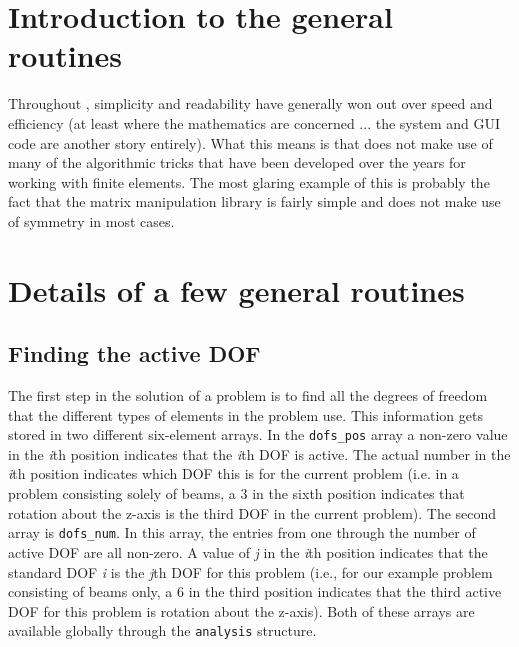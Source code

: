 \section{Introduction to the general \felt{} routines}

Throughout \felt{}, simplicity and readability have generally won out over 
speed and efficiency (at least where the mathematics are concerned ... the 
system and GUI code are another story entirely).
What this means is that \felt{} does not make use of many of the algorithmic 
tricks that have been developed over the years for working with finite 
elements.  The most glaring example of this is probably the fact that the 
\felt{} matrix manipulation library is fairly simple and does not make use of 
symmetry in most cases.  

\section{Details of a few general \felt{} routines}

\subsection{Finding the active DOF}
The first step in the solution of a \felt{} problem is to 
find all the degrees of freedom that the different types of elements in 
the problem use.  This information gets stored in two different six-element 
arrays.  In the {\tt dofs\_pos} array a non-zero value 
in the {\em i}th position indicates that the {\em i}th DOF is 
active.  The actual number in the {\em i}th position indicates which DOF this 
is for the current problem (i.e. in a problem consisting solely of beams, a 3 
in the sixth position indicates that rotation about the z-axis is the third 
DOF in the current problem).  The second array is {\tt dofs\_num}.  In
this array, the entries from one through the number of active DOF
are all non-zero.  A value of {\em j} in the {\em i}th position indicates
that the standard DOF {\em i} is the {\em j}th DOF for this problem (i.e.,
for our example problem consisting of beams only, a 6 in the third
position indicates that the third active DOF for this problem is rotation
about the z-axis).  Both of these arrays are available globally through the 
{\tt analysis} structure. 

